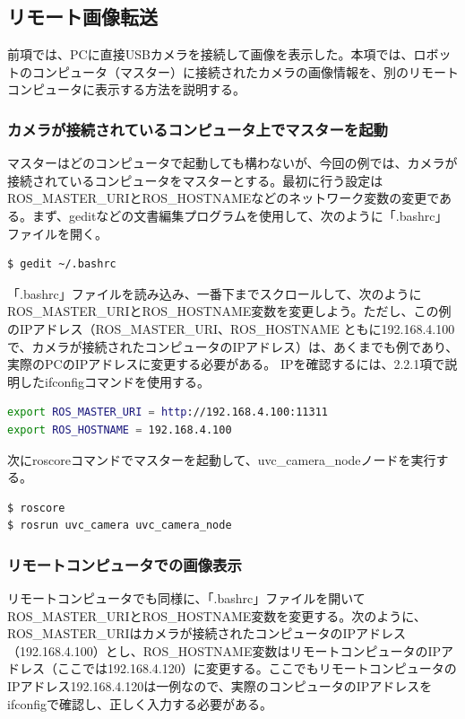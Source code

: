 \subsection{リモート画像転送}

前項では、PCに直接USBカメラを接続して画像を表示した。本項では、ロボットのコンピュータ（マスター）に接続されたカメラの画像情報を、別のリモートコンピュータに表示する方法を説明する。

\subsubsection{カメラが接続されているコンピュータ上でマスターを起動}

マスターはどのコンピュータで起動しても構わないが、今回の例では、カメラが接続されているコンピュータをマスターとする。最初に行う設定はROS\_MASTER\_URIとROS\_HOSTNAMEなどのネットワーク変数の変更である。まず、geditなどの文書編集プログラムを使用して、次のように「.bashrc」ファイルを開く。

\begin{lstlisting}[language=ROS]
$ gedit ~/.bashrc
\end{lstlisting}

「.bashrc」ファイルを読み込み、一番下までスクロールして、次のようにROS\_MASTER\_URIとROS\_HOSTNAME変数を変更しよう。ただし、この例のIPアドレス（ROS\_MASTER\_URI、ROS\_HOSTNAME ともに192.168.4.100で、カメラが接続されたコンピュータのIPアドレス）は、あくまでも例であり、実際のPCのIPアドレスに変更する必要がある。 IPを確認するには、2.2.1項で説明したifconfigコマンドを使用する。

\begin{lstlisting}[language=bash]
export ROS_MASTER_URI = http://192.168.4.100:11311
export ROS_HOSTNAME = 192.168.4.100
\end{lstlisting}

次にroscoreコマンドでマスターを起動して、uvc\_camera\_nodeノードを実行する。

\begin{lstlisting}[language=ROS]
$ roscore
$ rosrun uvc_camera uvc_camera_node
\end{lstlisting}

\subsubsection{リモートコンピュータでの画像表示}

リモートコンピュータでも同様に、「.bashrc」ファイルを開いてROS\_MASTER\_URIとROS\_HOSTNAME変数を変更する。次のように、ROS\_MASTER\_URIはカメラが接続されたコンピュータのIPアドレス（192.168.4.100）とし、ROS\_HOSTNAME変数はリモートコンピュータのIPアドレス（ここでは192.168.4.120）に変更する。ここでもリモートコンピュータのIPアドレス192.168.4.120は一例なので、実際のコンピュータのIPアドレスをifconfigで確認し、正しく入力する必要がある。

